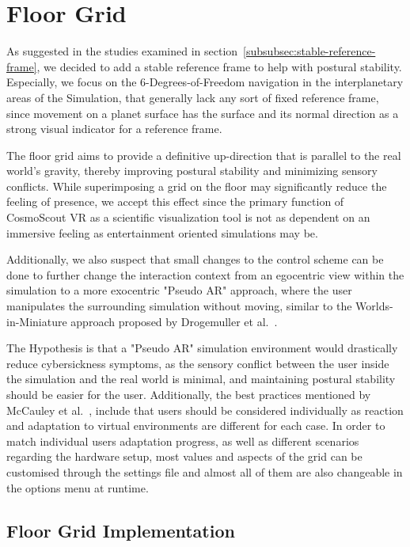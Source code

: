 \section{Floor Grid}\label{sec:floor-grid}

As suggested in the studies examined in section~\ref{subsubsec:stable-reference-frame}, we decided to add a stable
reference frame to help with postural stability.
Especially, we focus on the 6-Degrees-of-Freedom navigation in the interplanetary areas of the Simulation, that
generally lack any sort of fixed reference frame, since movement on a planet surface has the surface and its normal
direction as a strong visual indicator for a reference frame.

The floor grid aims to provide a definitive up-direction that is parallel to the real world's gravity, thereby
improving postural stability and minimizing sensory conflicts.
While superimposing a grid on the floor may significantly reduce the feeling of presence, we accept this effect since
the primary function of CosmoScout VR as a scientific visualization tool is not as dependent on an immersive feeling
as entertainment oriented simulations may be.

Additionally, we also suspect that small changes to the control scheme can be done to further change the interaction
context from an egocentric view within the simulation to a more exocentric "Pseudo AR" approach, where the user
manipulates the surrounding simulation without moving, similar to the Worlds-in-Miniature approach proposed
by Drogemuller et al.~\cite{Drogemuller2020}.

The Hypothesis is that a "Pseudo AR" simulation environment would drastically reduce cybersickness symptoms, as the
sensory conflict between the user inside the simulation and the real world is minimal, and maintaining postural
stability should be easier for the user.
Additionally, the best practices mentioned by McCauley et al.~\cite{McCauley1992}, include that users should be
considered individually as reaction and adaptation to virtual environments are different for each case.
In order to match individual users adaptation progress, as well as different scenarios regarding the hardware setup,
most values and aspects of the grid can be customised through the settings file and almost all of them are also
changeable in the options menu at runtime.

\subsection{Floor Grid Implementation}\label{subsec:floor-grid-implementation}

